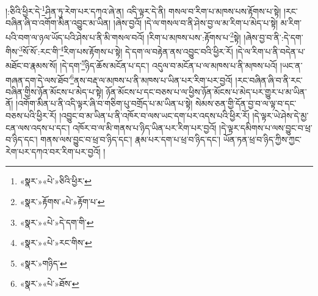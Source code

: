།:ཅིའི་ཕྱིར་དེ་\footnote{«སྣར་»«པེ་»ཅིའི་ཕྱིར་}ཤིན་ཏུ་རེག་པར་དཀའ་ཞེ་ན། འདི་ལྟར་དེ་ནི། གསལ་བ་རིག་པ་མཁས་པས་རྟོགས་པ་སྟེ། །རང་བཞིན་ཞི་བ་འགོག་མིན་འབྱུང་མ་ཡིན། །ཞེས་བྱའོ། །དེ་ལ་གསལ་བ་ནི་ཤེས་བྱ་ལ་མ་རིག་པ་མེད་པ་སྟེ། མ་རིག་པའི་བག་ལ་ཉལ་ཡོད་པའི་ཤེས་པ་ནི་མི་གསལ་བའོ། །རིག་པ་མཁས་པས་:རྟོགས་པ་\footnote{«སྣར་»རྟོགས་«པེ་»རྟོག་པ་}སྟེ། །ཞེས་བྱ་བ་ནི་:དེ་དག་གིས་\footnote{«སྣར་»«པེ་»དེ་དག་གི་}སོ་སོ་:རང་གི་\footnote{«སྣར་»«པེ་»རང་གིས་}རིག་པས་རྟོགས་པ་སྟེ། དེ་དག་ལ་བརྟེན་ནས་འབྱུང་བའི་ཕྱིར་རོ། །དེ་ལ་རིག་པ་ནི་བདེན་པ་མཐོང་བ་རྣམས་སོ། །དེ་དག་\footnote{«སྣར་»གཉིད་}ཉིད་ཆོས་མངོན་པ་དང་། འདུལ་བ་མངོན་པ་ལ་མཁས་པ་ནི་མཁས་པའོ། །ཡང་ན་གཞན་དག་དེ་ལས་ཐོབ་\footnote{«སྣར་»«པེ་»ཐོས་}ནས་བརྡ་ལ་མཁས་པ་ནི་མཁས་པ་ཡིན་པར་རིག་པར་བྱའོ། །རང་བཞིན་ཞི་བ་ནི་རང་བཞིན་གྱིས་ཉོན་མོངས་པ་མེད་པ་སྟེ། ཉོན་མོངས་པ་དང་བཅས་པ་ལ་ཕྱིས་ཉོན་མོངས་པ་མེད་པར་གྱུར་པ་མ་ཡིན་ནོ། །འགོག་མིན་པ་ནི་འདི་ལྟར་ཞི་བ་གཅིག་པུ་བགྲོད་པ་མ་ཡིན་པ་སྟེ། སེམས་ཅན་གྱི་དོན་བྱ་བ་ལ་ལྟ་བ་དང་བཅས་པའི་ཕྱིར་རོ། །འབྱུང་བ་མ་ཡིན་པ་ནི་འཁོར་བ་ལས་ཡང་དག་པར་འདས་པའི་ཕྱིར་རོ། །དེ་ལྟར་ཡེ་ཤེས་དེ་མྱ་ངན་ལས་འདས་པ་དང་། འཁོར་བ་ལ་མི་གནས་པ་ཉིད་ཡིན་པར་རིག་པར་བྱའོ། །དེ་ལྟར་དམིགས་པ་ལས་བྱུང་བ་ཕྲ་བ་ཉིད་དང་། གནས་ལས་བྱུང་བ་ཕྲ་བ་ཉིད་དང་། རྣམ་པར་དག་པ་ཕྲ་བ་ཉིད་དང་། ཡོན་ཏན་ཕྲ་བ་ཉིད་ཀྱིས་ཀྱང་རེག་པར་དཀའ་བར་རིག་པར་བྱའོ། །
